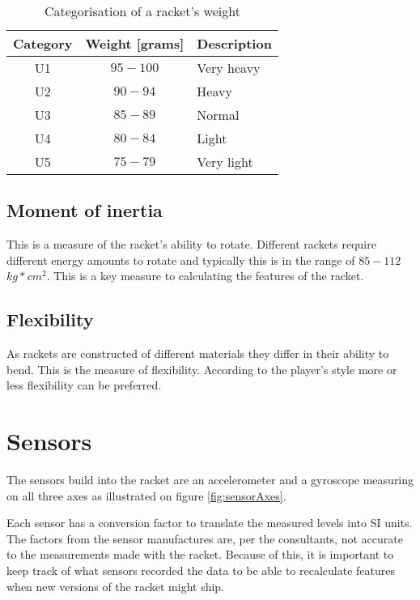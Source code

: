 \begin{table}
	\begin{center}
		\begin{tabularx}{0.7\textwidth}{C|C|L}
			\textbf{Category} & \textbf{Weight [grams]} & \textbf{Description} \\
			\hline
			U1                & $95-100$                  & Very heavy           \\
			U2                & $90-94$                   & Heavy                \\
			U3                & $85-89$                   & Normal               \\
			U4                & $80-84$                   & Light                \\
			U5                & $75-79$                   & Very light           \\
		\end{tabularx}
	\end{center}
    \caption{Categorisation of a racket's weight}
    \label{tab:racket:weight}
\end{table}

\subsection*{Moment of inertia}
This is a measure of the racket's ability to rotate.
Different rackets require different energy amounts to rotate and typically this is in the range of $85-112$ \(kg*cm^2\).
This is a key measure to calculating the features of the racket.

\subsection*{Flexibility}
As rackets are constructed of different materials they differ in their ability to bend.
This is the measure of flexibility.
According to the player's style more or less flexibility can be preferred.

\section{Sensors}
The sensors build into the racket are an accelerometer and a gyroscope measuring on all three axes as illustrated on figure \ref{fig:sensorAxes}.

Each sensor has a conversion factor to translate the measured levels into SI units.
The factors from the sensor manufactures are, per the consultants, not accurate to the measurements made with the racket.
Because of this, it is important to keep track of what sensors recorded the data to be able to recalculate features when new versions of the racket might ship.

